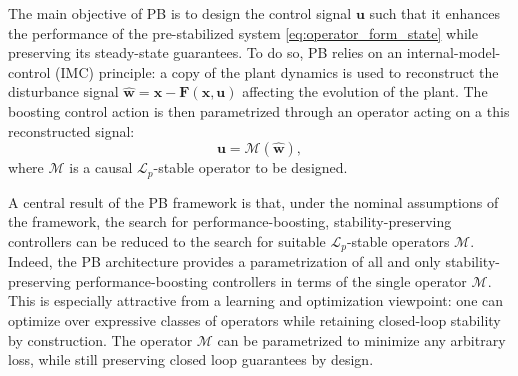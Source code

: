 \documentclass[journal,twoside,web]{ieeecolor}
\newcommand{\operator}{\mathcal{M}}
\begin{document}
The main objective of PB is to design the control signal $\mathbf{u}$ such that it enhances the performance of the pre-stabilized system \eqref{eq:operator_form_state} while preserving its steady-state guarantees. To do so, PB relies on an internal-model-control (IMC) principle: a copy of the plant dynamics is used to reconstruct the disturbance signal
\(\mathbf{\widehat w=x -F(x,u)}\) affecting the evolution of the plant. The boosting control action is then parametrized through an operator acting on a this reconstructed signal:
\[
\mathbf{u}= \operator(\mathbf{\widehat w}),
\]
where \(\operator\) is a causal \(\mathcal L_p\)-stable operator to be designed.


A central result of the PB framework is that, under the nominal assumptions of the framework, the search for performance-boosting, stability-preserving controllers can be
reduced to the search for suitable \(\mathcal L_p\)-stable operators \(\operator\). Indeed, the PB architecture provides a parametrization of all and only stability-preserving performance-boosting
controllers in terms of the single operator \(\operator\). This is especially attractive from a learning
and optimization viewpoint: one can optimize over expressive classes of operators while retaining
closed-loop stability by construction. The operator \(\operator\) can be parametrized to minimize any arbitrary loss, while still preserving closed loop guarantees by design.
\end{document}
